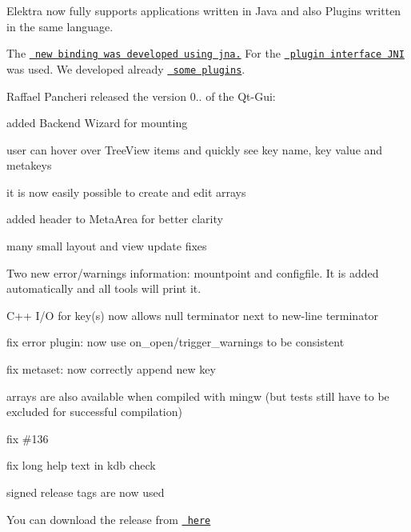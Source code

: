 Elektra now fully supports applications written in Java and also Plugins written in the same language.

The \href{https://github.com/ElektraInitiative/libelektra/tree/master/src/bindings/jna}{\texttt{ new binding was developed using jna.}} For the \href{https://github.com/ElektraInitiative/libelektra/tree/master/src/plugins/jni}{\texttt{ plugin interface J\+NI}} was used. We developed already \href{https://master.libelektra.org/src/bindings/jna/libelektra4j/src/main/java/org/libelektra/plugin}{\texttt{ some plugins}}.

Raffael Pancheri released the version 0.. of the Qt-\/\+Gui\+:


\begin{DoxyItemize}
\item added Backend Wizard for mounting
\item user can hover over Tree\+View items and quickly see key name, key value and metakeys
\item it is now easily possible to create and edit arrays
\item added header to Meta\+Area for better clarity
\item many small layout and view update fixes
\end{DoxyItemize}


\begin{DoxyItemize}
\item Two new error/warnings information\+: mountpoint and configfile. It is added automatically and all tools will print it.
\item C++ I/O for key(s) now allows null terminator next to new-\/line terminator
\item fix error plugin\+: now use {\ttfamily on\+\_\+open}/{\ttfamily trigger\+\_\+warnings} to be consistent
\item fix metaset\+: now correctly append new key
\item arrays are also available when compiled with mingw (but tests still have to be excluded for successful compilation)
\item fix \#136
\item fix long help text in {\ttfamily kdb check}
\item signed release tags are now used
\end{DoxyItemize}

You can download the release from \href{http://www.markus-raab.org/ftp/elektra/releases/elektra-0.8.10.tar.gz}{\texttt{ here}}


